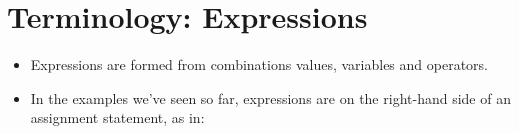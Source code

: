 \documentclass[letterpaper,10pt,english]{sphinxmanual}
\begin{document}
\section{Terminology: Expressions}
\label{\detokenize{lecture_notes/lec02_calculator:terminology-expressions}}\begin{itemize}
\item {} 
Expressions are formed from combinations values, variables and
operators.

\item {} 
In the examples we’ve seen so far, expressions are on the
right-hand side of an assignment statement, as in:

%
\begin{sphinxVerbatim}[commandchars=\\\{\}]
            
\end{sphinxVerbatim}

\end{itemize}
\end{document}
